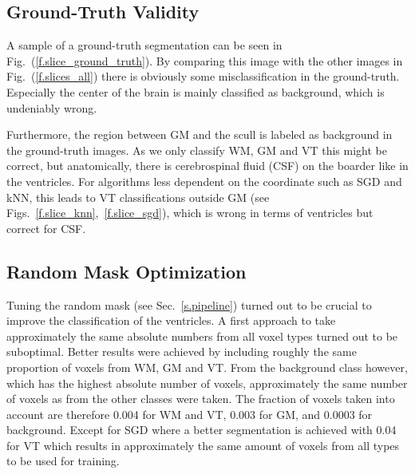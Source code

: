 \documentclass[journal]{IEEEtran}
\begin{document}
\subsection{Ground-Truth Validity}

A sample of a ground-truth segmentation can be seen in Fig.~(\ref{f.slice_ground_truth}). By comparing this image with the other images in Fig.~(\ref{f.slices_all}) there is obviously some misclassification in the ground-truth. Especially the center of the brain is mainly classified as background, which is undeniably wrong. 

Furthermore, the region between GM and the scull is labeled as background in the ground-truth images. As we only classify WM, GM and VT this might be correct, but anatomically, there is cerebrospinal fluid (CSF) on the boarder like in the ventricles. For algorithms less dependent on the coordinate such as SGD and kNN, this leads to VT classifications outside GM (see Figs.~\ref{f.slice_knn},~\ref{f.slice_sgd}), which is wrong in terms of ventricles but correct for CSF.


\subsection{Random Mask Optimization}

Tuning the random mask (see Sec.~\ref{s.pipeline}) turned out to be crucial to improve the classification of the ventricles. A first approach to take approximately the same absolute numbers from all voxel types turned out to be suboptimal. Better results were achieved by including roughly the same proportion of voxels from WM, GM and VT. From the background class however, which has the highest absolute number of voxels, approximately the same number of voxels as from the other classes were taken. The fraction of voxels taken into account are therefore 0.004 for WM and VT, 0.003 for GM, and 0.0003 for background. Except for SGD where a better segmentation is achieved with 0.04 for VT which results in approximately the same amount of voxels from all types to be used for training.
\end{document}
